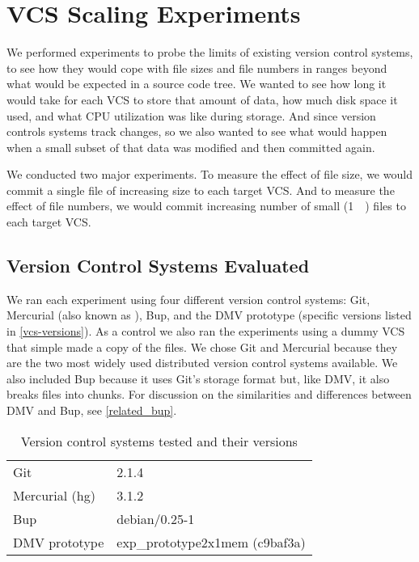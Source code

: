 \chapter{VCS Scaling Experiments}
\label{num-files-exp-desc}
\label{file-size-exp-desc}


We performed experiments to probe the limits of existing version control
systems, to see how they would cope with file sizes and file numbers in ranges
beyond what would be expected in a source code tree. We wanted to see how long
it would take for each VCS to store that amount of data, how much disk space it
used, and what CPU utilization was like during storage. And since version
controls systems track changes, so we also wanted to see what would happen when
a small subset of that data was modified and then committed again.

We conducted two major experiments. To measure the effect of file size, we would
\gls{commit} a single file of increasing size to each target VCS. And to measure
the effect of file numbers, we would \gls{commit} increasing number of small
(\SI{1}{\kibi\byte}) files to each target VCS.



\section{Version Control Systems Evaluated}

We ran each experiment using four different version control systems: Git,
Mercurial (also known as ), Bup, and the DMV prototype (specific
versions listed in \autoref{vcs-versions}). As a control we also ran the
experiments using a dummy VCS that simple made a copy of the files. We chose Git
and Mercurial because they are the two most widely used distributed version
control systems available. We also included Bup because it uses Git's storage
format but, like DMV, it also breaks files into chunks. For discussion on the
similarities and differences between DMV and Bup, see \autoref{related_bup}.


\begin{table}
    \caption{Version control systems tested and their versions}
    \label{vcs-versions}
    \centering
    \begin{tabular}{ l l }
        Git & 2.1.4 \\
        Mercurial (hg) & 3.1.2 \\
        Bup & debian/0.25-1 \\
        DMV prototype & exp\_prototype2x1mem (c9baf3a) \\
    \end{tabular}
\end{table}


